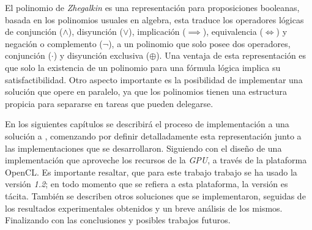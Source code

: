 El polinomio de \textit{Zhegalkin} es una representación para proposiciones booleanas, basada en los polinomios usuales en algebra, esta traduce los operadores lógicas de conjunción ($\land$), disyunción ($\lor$), implicación ($\implies$), equivalencia ($\iff$) y negación o complemento ($\neg$), a un polinomio que solo posee dos operadores, conjunción ($\cdot$) y disyunción exclusiva ($\oplus$). Una ventaja de esta representación es que solo la existencia de un polinomio para una fórmula lógica implica su satisfactibilidad. Otro aspecto importante es la posibilidad de implementar una solución que opere en paralelo, ya que los polinomios tienen una estructura propicia para separarse en tareas que pueden delegarse.

En los siguientes capítulos se describirá el proceso de implementación a una solución a \sat, comenzando por definir detalladamente esta representación junto a las implementaciones que se desarrollaron. Siguiendo con el diseño de una implementación que aproveche los recursos de la \textit{GPU}, a través de la plataforma OpenCL. Es importante resaltar, que para este trabajo trabajo se ha usado la versión \textit{1.2}; en todo momento que se refiera a esta plataforma, la versión es tácita. También se describen otros soluciones que se implementaron, seguidas de los resultados experimentales obtenidos y un breve análisis de los mismos. Finalizando con las conclusiones y posibles trabajos futuros.
